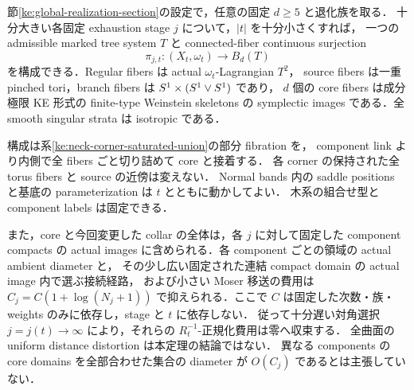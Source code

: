 \begin{theorem}
\label{ke:actual-global-fibration}
節\ref{ke:global-realization-section}の設定で，任意の固定 $d\ge5$ と退化族を取る．
十分大きい各固定 exhaustion stage $j$ について，$|t|$ を十分小さくすれば，
一つの admissible marked tree system $T$ と connected-fiber continuous surjection
\[
 \pi_{j,t}:(X_t,\omega_t)\longrightarrow B_d(T)
\]
を構成できる．Regular fibers は actual $\omega_t$-Lagrangian $T^2$，
source fibers は一重 pinched tori，branch fibers は $S^1\times(S^1\vee S^1)$ であり，
$d$ 個の core fibers は成分極限 KE 形式の finite-type Weinstein skeletons の
symplectic images である．全 smooth singular strata は isotropic である．

構成は系\ref{ke:neck-corner-saturated-union}の部分 fibration を，
component link より内側で全 fibers ごと切り詰めて core と接着する．
各 corner の保持された全 torus fibers と source の近傍は変えない．
Normal bands 内の saddle positions と基底の parameterization は $t$ とともに動かしてよい．
木系の組合せ型と component labels は固定できる．

また，core と今回変更した collar の全体は，各 $j$ に対して固定した component compacts の
actual images に含められる．各 component ごとの領域の actual ambient diameter と，
その少し広い固定された連結 compact domain の actual image 内で選ぶ接続経路，
および小さい Moser 移送の費用は
$C_j=C(1+\log(N_j+1))$ で抑えられる．ここで $C$ は固定した次数・族・weights
のみに依存し，stage と $t$ に依存しない．
従って十分遅い対角選択 $j=j(t)\to\infty$ により，それらの
$R_t^{-1}$-正規化費用は零へ収束する．
全曲面の uniform distance distortion は本定理の結論ではない．
異なる components の core domains を全部合わせた集合の diameter が
$O(C_j)$ であるとは主張していない．
\end{theorem}

